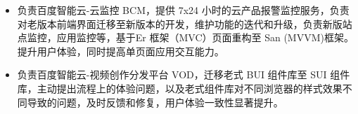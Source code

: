 \documentclass{resume}
\newcommand{\en}[1]{}
\newcommand{\zh}[1]{#1}
\begin{document}
\en{\datedsubsection{\textbf{\href{https://intl.cloud.baidu.com}{Baidu AI Cloud}}, Beijing, China}{01/2021 -- 08/2021}}
\zh{}
\en{\role{ACG Web Construction and Cloud Marketing Department}{Front-End Intern}}
\zh{}
\begin{itemize}
    \item \en{Led development of Baidu AI Cloud-BCM providing 24×7 cloud product monitoring and alerting services. Responsible for migrating legacy frontend interfaces to new versions, maintaining feature iterations and upgrades, and developing new site monitoring and application monitoring modules. Refactored pages from Er framework (MVC) to San framework (MVVM), improving user experience and enhancing single-page application interactivity.}
          \zh{负责百度智能云-云监控 BCM，提供 7x24 小时的云产品报警监控服务，负责对老版本前端界面迁移至新版本的开发，维护功能的迭代和升级，负责新版站点监控，应用监控等，基于Er 框架（MVC）页面重构至 San (MVVM)框架。提升用户体验，同时提高单页面应用交互能力。}
    \item \en{Owned Baidu AI Cloud-VOD (Video Creation \& Distribution) migration from legacy BUI to SUI, proactively addressing UX workflow issues and cross-browser style inconsistencies to deliver a markedly more consistent user experience.}
          \zh{负责百度智能云-视频创作分发平台 VOD，迁移老式 BUI 组件库至 SUI 组件库，主动提出流程上的体验问题，以及老式组件库对不同浏览器的样式效果不同导致的问题，及时反馈和修复，用户体验一致性显著提升。}
\end{itemize}
\end{document}
